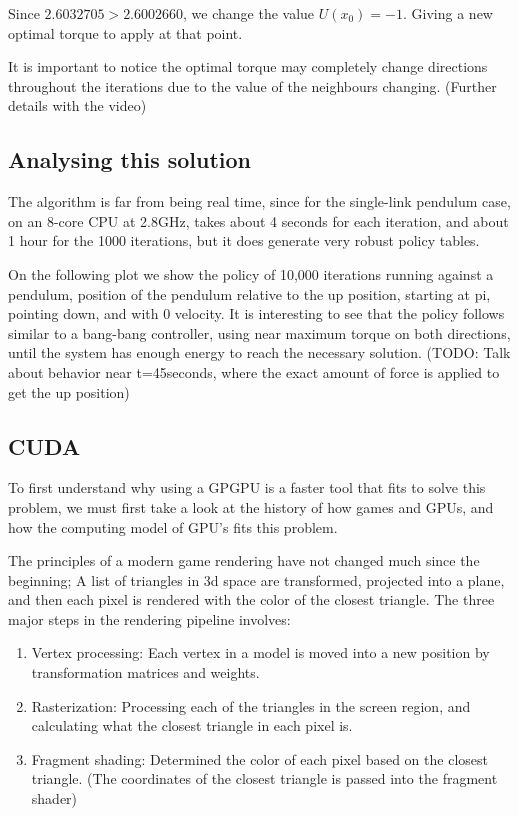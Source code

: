 \documentclass[12pt]{report}
\begin{document}
Since $2.6032705 > 2.6002660$, we change the value $U(x_0)={-1}$. Giving a new optimal torque to apply at that point.

It is important to notice the optimal torque may completely change directions throughout the iterations due to the value of the neighbours changing. (Further details with the video)

\subsection{Analysing this solution}
The algorithm is far from being real time, since for the single-link pendulum case, on an 8-core CPU at 2.8GHz, takes about 4 seconds for each iteration, and about 1 hour for the 1000 iterations, but it does generate very robust policy tables.

On the following plot we show the policy of 10,000 iterations running against a pendulum, position of the pendulum relative to the up position, starting at pi, pointing down, and with 0 velocity. It is interesting to see that the policy follows similar to a bang-bang controller, using near maximum torque on both directions, until the system has enough energy to reach the necessary solution. (TODO: Talk about behavior near t=45seconds, where the exact amount of force is applied to get the up position)

\subsection{CUDA}

To first understand why using a GPGPU is a faster tool that fits to solve this problem, we must first take a look at the history of how games and GPUs, and how the computing model of GPU’s fits this problem.

The principles of a modern game rendering have not changed much since the beginning; A list of triangles in 3d space are transformed, projected into a plane, and then each pixel is rendered with the color of the closest triangle. The three major steps in the rendering pipeline involves:

\begin{enumerate}
\item Vertex processing: Each vertex in a model is moved into a new position by transformation matrices and weights.
\item Rasterization: Processing each of the triangles in the screen region, and calculating what the closest triangle in each pixel is.
\item Fragment shading: Determined the color of each pixel based on the closest triangle. (The coordinates of the closest triangle is passed into the fragment shader)
\end{enumerate}
\end{document}

